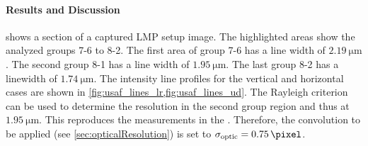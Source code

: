 \paragraph{Results and Discussion}
 shows a section of a captured \ac{LMP} setup image.
The highlighted areas show the analyzed groups 7-6 to 8-2.
The first area of group 7-6  has a line width of $\SI{2.19}{\micro\meter}$.
The second group 8-1  has a line width of $\SI{1.95}{\micro\meter}$.
The last group 8-2  has a linewidth of $\SI{1.74}{\micro\meter}$.
The intensity line profiles for the vertical and horizontal cases are shown in \cref{fig:usaf_lines_lr,fig:usaf_lines_ud}.
The Rayleigh criterion can be used to determine the resolution in the second group region and thus at $\SI{1.95}{\micro\meter}$.
This reproduces the measurements in the \cite{MenzelMaster}.
Therefore, the convolution to be applied (see \cref{sec:opticalResolution}) is set to $\opticsigma = \SI{0.75}{\pixel}$.
%
%
%
